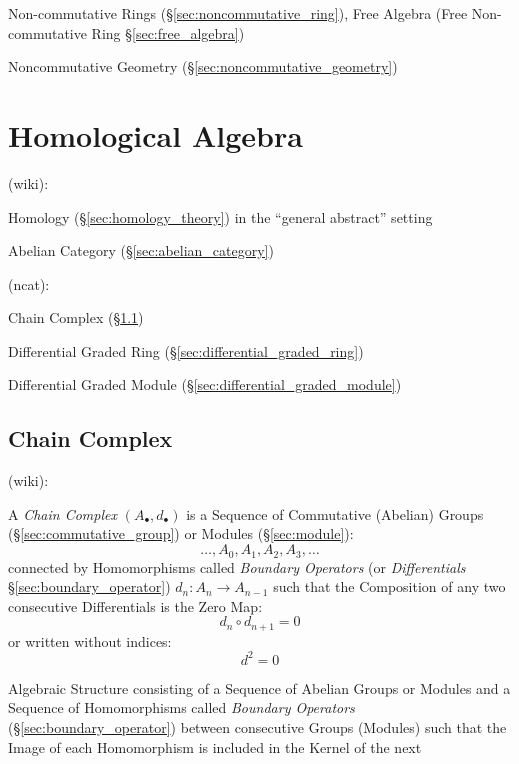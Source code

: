 Non-commutative Rings (\S\ref{sec:noncommutative_ring}),
Free Algebra (Free Non-commutative Ring \S\ref{sec:free_algebra})

Noncommutative Geometry (\S\ref{sec:noncommutative_geometry})



\section{Homological Algebra}\label{sec:homological_algebra}

(wiki):

Homology (\S\ref{sec:homology_theory}) in the ``general abstract'' setting

Abelian Category (\S\ref{sec:abelian_category})

(ncat):

Chain Complex (\S\ref{sec:chain_complex})

Differential Graded Ring (\S\ref{sec:differential_graded_ring})

Differential Graded Module (\S\ref{sec:differential_graded_module})



\subsection{Chain Complex}\label{sec:chain_complex}

(wiki):

A \emph{Chain Complex} $(A_\bullet, d_\bullet)$ is a Sequence of Commutative
(Abelian) Groups (\S\ref{sec:commutative_group}) or Modules
(\S\ref{sec:module}):
\[
  \ldots, A_0, A_1, A_2, A_3, \ldots
\]
connected by Homomorphisms called \emph{Boundary Operators} (or
\emph{Differentials} \S\ref{sec:boundary_operator}) $d_n : A_n \rightarrow
A_{n-1}$ such that the Composition of any two consecutive Differentials is
the Zero Map:
\[
  d_n \circ d_{n+1} = 0
\]
or written without indices:
\[
  d^2 = 0
\]

Algebraic Structure consisting of a Sequence of Abelian Groups or Modules and a
Sequence of Homomorphisms called \emph{Boundary Operators}
(\S\ref{sec:boundary_operator}) between consecutive Groups (Modules) such that
the Image of each Homomorphism is included in the Kernel of the next

